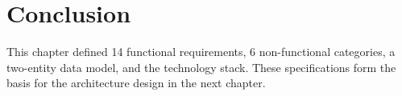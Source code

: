 \FloatBarrier

\section*{Conclusion}

This chapter defined 14 functional requirements, 6 non-functional categories,
a two-entity data model, and the technology stack. These specifications form
the basis for the architecture design in the next chapter.
